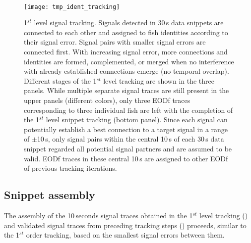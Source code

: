 \begin{figure}[t]
  \begin{minipage}[t]{0.4\textwidth}\mbox{}\\[-2ex]
    \texttt{[image: tmp\_ident\_tracking]}
  \end{minipage}
  \hfill
  \begin{minipage}[t]{0.38\textwidth}
  \caption{\label{tmp_tracking} 1$^{st}$ level signal tracking. Signals detected in  30\,s data snippets are connected to each other and assigned to fish identities according to their signal error. Signal pairs with smaller signal errors are connected first. With increasing signal error, more connections and identities are formed, complemented, or merged when no interference with already established connections emerge (no temporal overlap). Different stages of the 1$^{st}$ level tracking are shown in the three panels. While multiple separate signal traces are still present in the upper panels (different colors), only three EODf traces corresponding to three individual fish are left with the completion of the 1$^{st}$ level snippet tracking (bottom panel). Since each signal can potentially establish a best connection to a target signal in a range of $\pm$10\,s, only signal pairs within the central 10\,s of each 30\,s data snippet regarded all potential signal partners and are assumed to be valid. EODf traces in these central 10\,s are assigned to other EODf of previous tracking iterations.}
  \end{minipage}
\end{figure}

\subsection{Snippet assembly}
The assembly of the 10\,seconds signal traces obtained in the 1$^{st}$ level tracking () and validated signal traces from preceding tracking steps () proceeds, similar to the 1$^{st}$ order tracking, based on the smallest signal errors between them. 

